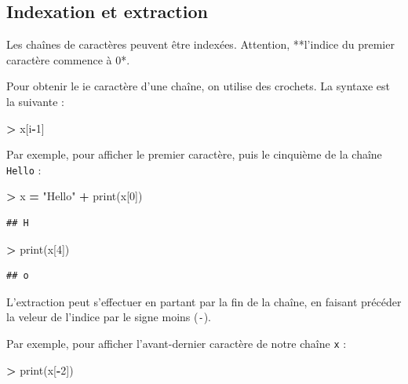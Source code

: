 \documentclass[12pt,]{book}
\newenvironment{Shaded}{\begin{snugshade}}{\end{snugshade}}
\newcommand{\DecValTok}[1]{\textcolor[rgb]{0.00,0.00,0.81}{#1}}
\newcommand{\StringTok}[1]{\textcolor[rgb]{0.31,0.60,0.02}{#1}}
\newcommand{\OperatorTok}[1]{\textcolor[rgb]{0.81,0.36,0.00}{\textbf{#1}}}
\newcommand{\BuiltInTok}[1]{#1}
\newcommand{\NormalTok}[1]{#1}
\numberwithin{equation}{section}
\numberwithin{countremarque}{section}
\begin{document}
\subsection{Indexation et extraction}\label{indexation-et-extraction}

Les chaînes de caractères peuvent être indexées. Attention, **l'indice
du premier caractère commence à 0*.

Pour obtenir le ie caractère d'une chaîne, on utilise des crochets. La
syntaxe est la suivante :

\begin{Shaded}
\begin{Highlighting}[]
\OperatorTok{>}\NormalTok{ x[i}\OperatorTok{-}\DecValTok{1}\NormalTok{]}
\end{Highlighting}
\end{Shaded}

Par exemple, pour afficher le premier caractère, puis le cinquième de la
chaîne \texttt{Hello} :

\begin{Shaded}
\begin{Highlighting}[]
\OperatorTok{>}\NormalTok{ x }\OperatorTok{=} \StringTok{"Hello"}
\OperatorTok{+} \BuiltInTok{print}\NormalTok{(x[}\DecValTok{0}\NormalTok{])}
\end{Highlighting}
\end{Shaded}

\begin{lstlisting}
## H
\end{lstlisting}

\begin{Shaded}
\begin{Highlighting}[]
\OperatorTok{>} \BuiltInTok{print}\NormalTok{(x[}\DecValTok{4}\NormalTok{])}
\end{Highlighting}
\end{Shaded}

\begin{lstlisting}
## o
\end{lstlisting}

L'extraction peut s'effectuer en partant par la fin de la chaîne, en
faisant précéder la veleur de l'indice par le signe moins (\texttt{-}).

Par exemple, pour afficher l'avant-dernier caractère de notre chaîne
\texttt{x} :

\begin{Shaded}
\begin{Highlighting}[]
\OperatorTok{>} \BuiltInTok{print}\NormalTok{(x[}\OperatorTok{-}\DecValTok{2}\NormalTok{])}
\end{Highlighting}
\end{Shaded}
\end{document}
